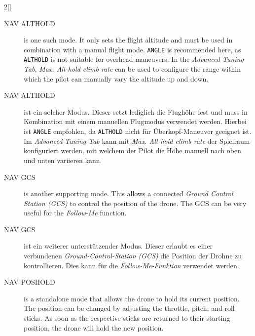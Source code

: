 \begin{paracol}{2}[]
\colende

\renewcommand{\deutschertitel}{Navigationsflugmodi in INAV}
\renewcommand{\englischertitel}{Navigation Modes in INAV}
\makrounterabschnitt
\label{AbschnittINAVigationModes}

\begin{description}
		\item[NAV ALTHOLD] is one such mode. It only sets the flight altitude and must be used in combination with a manual flight mode. \texttt{ANGLE} is recommended here, as \texttt{ALTHOLD} is not suitable for overhead maneuvers. In the \textsl{Advanced Tuning Tab}, \textsl{Max. Alt-hold climb rate} can be used to configure the range within which the pilot can manually vary the altitude up and down.
\end{description}

\colger

\begin{description}
		\item[NAV ALTHOLD] ist ein solcher Modus. Dieser setzt lediglich die Flughöhe fest und muss in Kombination mit einem manuellen Flugmodus verwendet werden. Hierbei ist \texttt{ANGLE} empfohlen, da \texttt{ALTHOLD} nicht für Überkopf-Maneuver geeignet ist. Im \textsl{Advanced-Tuning-Tab} kann mit \textsl{Max. Alt-hold climb rate} der Spielraum konfiguriert werden, mit welchem der Pilot die Höhe manuell nach oben und unten variieren kann.
\end{description}

\coleng

\begin{description}
		\item[NAV GCS] is another supporting mode. This allows a connected \textsl{Ground Control Station (GCS)} to control the position of the drone. The GCS can be very useful for the \textsl{Follow-Me} function.
\end{description}

\colger

\begin{description}
		\item[NAV GCS] ist ein weiterer unterstützender Modus. Dieser erlaubt es einer verbundenen \textsl{Ground-Control-Station (GCS)} die Position der Drohne zu kontrollieren. Dies kann für die \textsl{Follow-Me-Funktion} verwendet werden.
\end{description}

\coleng

\begin{description}
	\item[NAV POSHOLD] is a standalone mode that allows the drone to hold its current position. The position can be changed by adjusting the throttle, pitch, and roll sticks. As soon as the respective sticks are returned to their starting position, the drone will hold the new position.
\end{description}


\end{paracol}
